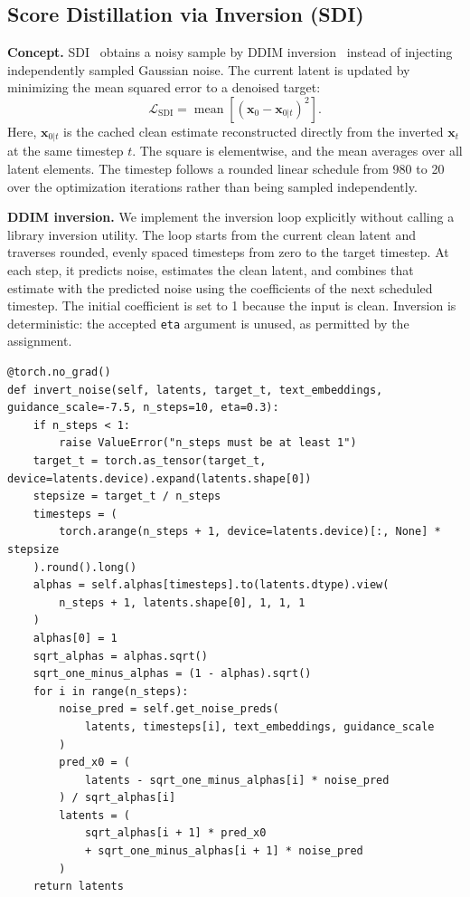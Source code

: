 \subsection{Score Distillation via Inversion (SDI)}
\label{sec:sdi}

\noindent\textbf{Concept.}
SDI~\cite{lukoianov2024sdi} obtains a noisy sample by DDIM inversion~\cite{song2021ddim} instead of
injecting independently sampled Gaussian noise.
The current latent is updated by minimizing the mean squared error to a denoised target:
\begin{equation}
 \mathcal{L}_{\mathrm{SDI}}
 =\operatorname{mean}\!\left[(\mathbf{x}_0-\mathbf{x}_{0|t})^2\right].
 \label{eq:sdi_reconstruction_loss}
\end{equation}
Here, $\mathbf{x}_{0|t}$ is the cached clean estimate reconstructed directly from the inverted
$\mathbf{x}_t$ at the same timestep $t$.
The square is elementwise, and the mean averages over all latent elements.
The timestep follows a rounded linear schedule from 980 to 20 over the optimization iterations
rather than being sampled independently.

\noindent\textbf{DDIM inversion.}
We implement the inversion loop explicitly without calling a library inversion utility.
The loop starts from the current clean latent and traverses rounded, evenly spaced timesteps from
zero to the target timestep.
At each step, it predicts noise, estimates the clean latent, and combines that estimate with the
predicted noise using the coefficients of the next scheduled timestep.
The initial coefficient is set to 1 because the input is clean.
Inversion is deterministic: the accepted \texttt{eta} argument is unused, as permitted by the
assignment.

\begin{lstlisting}
@torch.no_grad()
def invert_noise(self, latents, target_t, text_embeddings, guidance_scale=-7.5, n_steps=10, eta=0.3):
    if n_steps < 1:
        raise ValueError("n_steps must be at least 1")
    target_t = torch.as_tensor(target_t, device=latents.device).expand(latents.shape[0])
    stepsize = target_t / n_steps
    timesteps = (
        torch.arange(n_steps + 1, device=latents.device)[:, None] * stepsize
    ).round().long()
    alphas = self.alphas[timesteps].to(latents.dtype).view(
        n_steps + 1, latents.shape[0], 1, 1, 1
    )
    alphas[0] = 1
    sqrt_alphas = alphas.sqrt()
    sqrt_one_minus_alphas = (1 - alphas).sqrt()
    for i in range(n_steps):
        noise_pred = self.get_noise_preds(
            latents, timesteps[i], text_embeddings, guidance_scale
        )
        pred_x0 = (
            latents - sqrt_one_minus_alphas[i] * noise_pred
        ) / sqrt_alphas[i]
        latents = (
            sqrt_alphas[i + 1] * pred_x0
            + sqrt_one_minus_alphas[i + 1] * noise_pred
        )
    return latents
\end{lstlisting}

